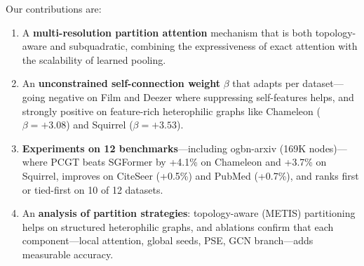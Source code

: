 Our contributions are:
\begin{enumerate}
\item A \textbf{multi-resolution partition attention} mechanism that is both topology-aware and subquadratic, combining the expressiveness of exact attention with the scalability of learned pooling.
\item An \textbf{unconstrained self-connection weight} $\beta$ that adapts per dataset---going negative on Film and Deezer where suppressing self-features helps, and strongly positive on feature-rich heterophilic graphs like Chameleon ($\beta = +3.08$) and Squirrel ($\beta = +3.53$).
\item \textbf{Experiments on 12 benchmarks}---including ogbn-arxiv (169K nodes)---where PCGT beats SGFormer by +4.1\% on Chameleon and +3.7\% on Squirrel, improves on CiteSeer (+0.5\%) and PubMed (+0.7\%), and ranks first or tied-first on 10 of 12 datasets.
\item An \textbf{analysis of partition strategies}: topology-aware (METIS) partitioning helps on structured heterophilic graphs, and ablations confirm that each component---local attention, global seeds, PSE, GCN branch---adds measurable accuracy.
\end{enumerate}
